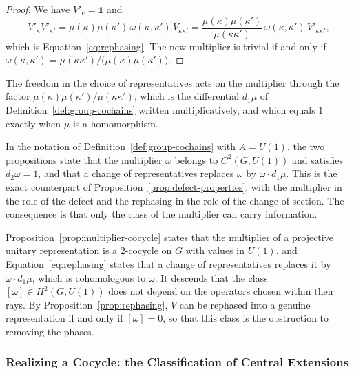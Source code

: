 \begin{proof}
	We have $V'_e=\mathbb{1}$ and
	\begin{equation*}
		V'_\kappa V'_{\kappa'}=\mu(\kappa)\mu(\kappa')\,\omega(\kappa,\kappa')\,V_{\kappa\kappa'}=\frac{\mu(\kappa)\mu(\kappa')}{\mu(\kappa\kappa')}\,\omega(\kappa,\kappa')\,V'_{\kappa\kappa'},
	\end{equation*}
	which is Equation~\eqref{eq:rephasing}. The new multiplier is trivial if and only if $\omega(\kappa,\kappa')=\mu(\kappa\kappa')\big/\big(\mu(\kappa)\mu(\kappa')\big)$.
\end{proof}

\noindent The freedom in the choice of representatives acts on the multiplier through the factor $\mu(\kappa)\mu(\kappa')/\mu(\kappa\kappa')$, which is the differential $d_1\mu$ of Definition~\ref{def:group-cochains} written multiplicatively, and which equals $1$ exactly when $\mu$ is a homomorphism.

In the notation of Definition~\ref{def:group-cochains} with $A=U(1)$, the two propositions state that the multiplier $\omega$ belongs to $C^2(G,U(1))$ and satisfies $d_2\omega=1$, and that a change of representatives replaces $\omega$ by $\omega\cdot d_1\mu$. This is the exact counterpart of Proposition~\ref{prop:defect-properties}, with the multiplier in the role of the defect and the rephasing in the role of the change of section. The consequence is that only the class of the multiplier can carry information.

\begin{remark}\label{rem:class-of-multiplier}
	Proposition~\ref{prop:multiplier-cocycle} states that the multiplier of a projective unitary representation is a $2$-cocycle on $G$ with values in $U(1)$, and Equation~\eqref{eq:rephasing} states that a change of representatives replaces it by $\omega\cdot d_1\mu$, which is cohomologous to $\omega$. It descends that the class $[\omega]\in H^2(G,U(1))$ does not depend on the operators chosen within their rays. By Proposition~\ref{prop:rephasing}, $V$ can be rephased into a genuine representation if and only if $[\omega]=0$, so that this class is the obstruction to removing the phases.
\end{remark}

\subsubsection*{Realizing a Cocycle: the Classification of Central Extensions}

